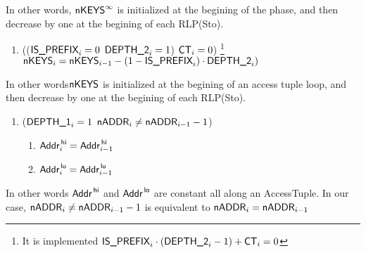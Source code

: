 In other words, $\textsf{nKEYS}^\infty$ is initialized at the begining of the phase, and then decrease by one at the begining of each RLP(Sto).
\begin{enumerate}[resume]
	\item \If (($\textsf{IS\_PREFIX}_{i}=0$ \Or $\textsf{DEPTH\_2}_{i}=1$) \et $\textsf{CT}_{i}=0$) \footnote{It is implemented \If $\textsf{IS\_PREFIX}_{i} \cdot (\textsf{DEPTH\_2}_{i}-1) +\textsf{CT}_{i} =0$ \Then} \Then $\textsf{nKEYS}_{i} = \textsf{nKEYS}_{i-1} - (1- \textsf{IS\_PREFIX}_{i}) \cdot \textsf{DEPTH\_2}_{i})$
\end{enumerate}
In other words$\textsf{nKEYS}$ is initialized at the begining of an access tuple loop, and then decrease by one at the begining of each RLP(Sto).
\begin{enumerate}[resume]
	\item \If ($\textsf{DEPTH\_1}_{i}=1$ \et $\textsf{nADDR}_{i} \neq \textsf{nADDR}_{i-1} -1$) \Then 
		\begin{enumerate}
			\item $\textsf{Addr}^{\mathsf{\,hi}}_{i} = \textsf{Addr}^{\mathsf{\,hi}}_{i-1}$
			\item $\textsf{Addr}^{\mathsf{\,lo}}_{i} = \textsf{Addr}^{\mathsf{\,lo}}_{i-1}$
		\end{enumerate}
\end{enumerate}
In other words $\textsf{Addr}^{\mathsf{\,hi}}$ and $\textsf{Addr}^{\mathsf{\,lo}}$ are constant all along an AccessTuple.
\saNote{} In our case, $\textsf{nADDR}_{i} \neq \textsf{nADDR}_{i-1} -1$ is equivalent to $\textsf{nADDR}_{i} = \textsf{nADDR}_{i-1}$

